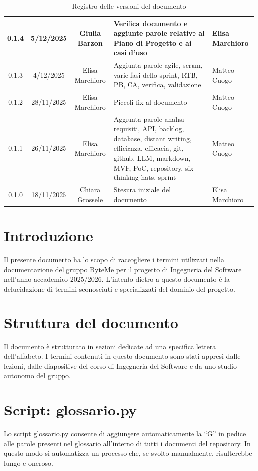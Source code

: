 \documentclass[11pt,a4paper]{article}
\begin{document}
\begin{table}[H]
\begin{tabular}{|c|c|c|>{\raggedright\arraybackslash}p{}|p{}|}
        \hline
        0.1.4 & 5/12/2025 & Giulia Barzon & Verifica documento e aggiunte parole relative al Piano di Progetto e ai casi d'uso & Elisa Marchioro\\
        \hline
        0.1.3 & 4/12/2025 & Elisa Marchioro & Aggiunta parole agile, scrum, varie fasi dello sprint, RTB, PB, CA, verifica, validazione & Matteo Cuogo\\
        \hline
        0.1.2 & 28/11/2025 & Elisa Marchioro & Piccoli fix al documento & Matteo Cuogo\\
        \hline
        0.1.1 & 26/11/2025 & Elisa Marchioro & Aggiunta parole analisi requisiti, API, backlog, database, distant writing, efficienza, efficacia, git, github, LLM, markdown, MVP, PoC, repository, six thinking hats, sprint & Matteo Cuogo\\
        \hline
        0.1.0 & 18/11/2025 & Chiara Grossele & Stesura iniziale del documento & Elisa Marchioro\\
        \hline
    \end{tabular}
    \caption{Registro delle versioni del documento}
    \label{tab:versionamento}
\end{table}

\newpage

\tableofcontents
\thispagestyle{empty}
\newpage
\setcounter{page}{1}

\section{Introduzione}
Il presente documento ha lo scopo di raccogliere i termini utilizzati nella documentazione del gruppo ByteMe per il progetto di Ingegneria del Software nell'anno accademico 2025/2026.
L'intento dietro a questo documento è la delucidazione di termini sconosciuti e specializzati del dominio del progetto.

\section{Struttura del documento}
Il documento è strutturato in sezioni dedicate ad una specifica lettera dell'alfabeto. I termini contenuti in questo documento sono stati appresi dalle lezioni, dalle diapositive del corso di Ingegneria del Software e da uno studio autonomo del gruppo.

\section{Script: glossario.py}
Lo script glossario.py consente di aggiungere automaticamente la “G” in pedice alle parole presenti nel glossario all’interno di tutti i documenti del repository. In questo modo si automatizza un processo che, se svolto manualmente, risulterebbe lungo e oneroso.
\newpage
\end{document}
